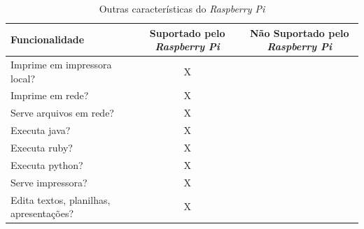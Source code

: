 \begin{table}[!htpb]
 \centering
    \begin{tabular}{|p{4cm}|c|c|} 
    \hline
        \textbf{Funcionalidade} & \textbf{Suportado pelo \textit{Raspberry Pi}} & \textbf{Não Suportado pelo \textit{Raspberry Pi}} \\
    \hline
        Imprime em impressora local? & X & \\
    \hline
        Imprime em rede? & X & \\
    \hline
        Serve arquivos em rede? & X & \\
    \hline
        Executa java? & X & \\
    \hline
        Executa ruby? & X & \\
    \hline
        Executa python? & X & \\
    \hline
        Serve impressora? & X & \\
    \hline
        Edita textos, planilhas, apresentações? & X & \\
    \hline
    \end{tabular}
    \caption{Outras características do \textit{Raspberry Pi}}
    \label{t_fixa}
\end{table}
